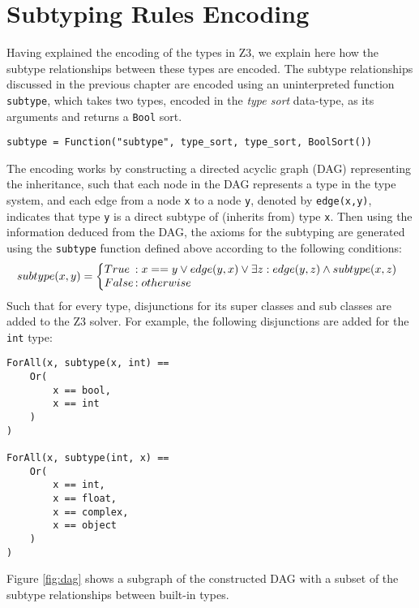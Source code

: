 \section{Subtyping Rules Encoding}\label{sec:sub_encode}
Having explained the encoding of the types in Z3, we explain here how the subtype relationships between these types are encoded. The subtype relationships discussed in the previous chapter are encoded using an uninterpreted function \lstinline|subtype|, which takes two types, encoded in the \textit{type sort} data-type, as its arguments and returns a \lstinline|Bool| sort.
\begin{lstlisting}
subtype = Function("subtype", type_sort, type_sort, BoolSort())
\end{lstlisting}
The encoding works by constructing a directed acyclic graph (DAG) representing the inheritance, such that each node in the DAG represents a type in the type system, and each edge from a node \lstinline|x| to a node \lstinline|y|, denoted by \lstinline|edge(x,y)|, indicates that type \lstinline|y| is a direct subtype of (inherits from) type \lstinline|x|. Then using the information deduced from the DAG, the axioms for the subtyping are generated using the \lstinline|subtype| function defined above according to the following conditions:
\[
	subtype(x,y) = \left\{
	\begin{array}{@{}l@{\thinspace}l}
	True & : x == y \lor edge(y, x) \lor \exists z : edge(y, z) \land subtype(x, z) \\
	False & : otherwise\\
	
	\end{array}
	\right.
\]
Such that for every type, disjunctions for its super classes and sub classes are added to the Z3 solver. For example, the following disjunctions are added for the \lstinline|int| type:

\begin{lstlisting}
ForAll(x, subtype(x, int) == 
	Or(
		x == bool,
		x == int
	)
)

ForAll(x, subtype(int, x) == 
	Or(
		x == int,
		x == float,
		x == complex,
		x == object
	)
)
\end{lstlisting}

Figure \ref{fig:dag} shows a subgraph of the constructed DAG with a subset of the subtype relationships between built-in types.

